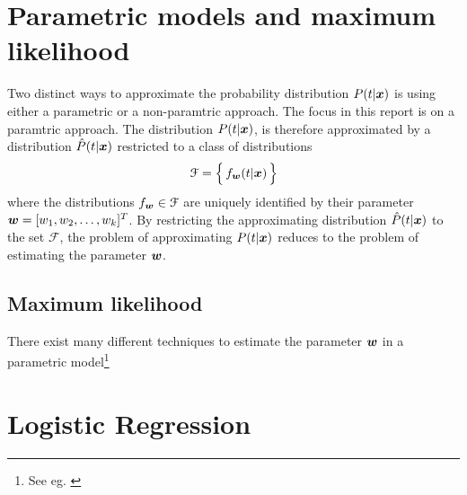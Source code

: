 \section{Parametric models and maximum likelihood}\label{sec:parametric-models-and-likelihood}
Two distinct ways to approximate the probability distribution $P(t|\boldsymbol{x})$ is using either a parametric or a non-paramtric approach. The focus in this report is on a paramtric approach. The distribution $P(t|\boldsymbol{x})$, is therefore approximated by a distribution $\hat{P}(t|\boldsymbol{x})$ restricted to a class of distributions
\[
    \mathcal{F} = \Bigl\{\,f_{\boldsymbol{w}}(t|\boldsymbol{x})\,\Bigr\}
\]
where the distributions $f_{\boldsymbol{w}}\in\mathcal{F}$ are uniquely identified by their parameter $\boldsymbol{w}=[w_1, w_2, \dots, w_k]^T$. By restricting the approximating distribution $\hat{P}(t|\boldsymbol{x})$ to the set $\mathcal{F}$, the problem of approximating $P(t|\boldsymbol{x})$ reduces to the problem of estimating the parameter $\boldsymbol{w}$.

\subsection{Maximum likelihood}
There exist many different techniques to estimate the parameter $\boldsymbol{w}$ in a parametric model\footnote{See eg. \citet[Sec.9]{wasserman04}}




\section{Logistic Regression}




